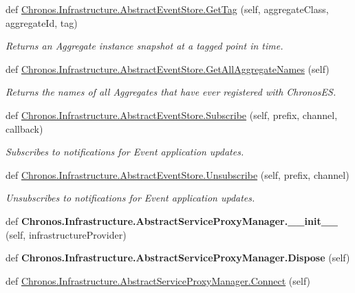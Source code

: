 \begin{DoxyCompactItemize}
\item 
def \hyperlink{group__Chronos_ga6e7bef46c596b6148c2afd64032c9cc7}{Chronos.\+Infrastructure.\+Abstract\+Event\+Store.\+Get\+Tag} (self, aggregate\+Class, aggregate\+Id, tag)
\begin{DoxyCompactList}\small\item\em Returns an Aggregate instance snapshot at a tagged point in time. \end{DoxyCompactList}\item 
def \hyperlink{group__Chronos_ga8c99114f487e0549eefe4b754d06ffa0}{Chronos.\+Infrastructure.\+Abstract\+Event\+Store.\+Get\+All\+Aggregate\+Names} (self)
\begin{DoxyCompactList}\small\item\em Returns the names of all Aggregates that have ever registered with Chronos\+ES. \end{DoxyCompactList}\item 
def \hyperlink{group__Chronos_gab7cf7e29ee38e091d177b793abdc8b0c}{Chronos.\+Infrastructure.\+Abstract\+Event\+Store.\+Subscribe} (self, prefix, channel, callback)
\begin{DoxyCompactList}\small\item\em Subscribes to notifications for Event application updates. \end{DoxyCompactList}\item 
def \hyperlink{group__Chronos_ga5d1257300d4e388a5061d8ffec6f1ff2}{Chronos.\+Infrastructure.\+Abstract\+Event\+Store.\+Unsubscribe} (self, prefix, channel)
\begin{DoxyCompactList}\small\item\em Unsubscribes to notifications for Event application updates. \end{DoxyCompactList}\item 
def {\bfseries Chronos.\+Infrastructure.\+Abstract\+Service\+Proxy\+Manager.\+\_\+\+\_\+init\+\_\+\+\_\+} (self, infrastructure\+Provider)\hypertarget{group__Chronos_gabe7b1bbccec08b8be6a5441869574d29}{}\label{group__Chronos_gabe7b1bbccec08b8be6a5441869574d29}

\item 
def {\bfseries Chronos.\+Infrastructure.\+Abstract\+Service\+Proxy\+Manager.\+Dispose} (self)\hypertarget{group__Chronos_ga74d297960d208c66e2ed2feea4e9f943}{}\label{group__Chronos_ga74d297960d208c66e2ed2feea4e9f943}

\item 
def \hyperlink{group__Chronos_ga7156c455573fce038d857e4b950a25b3}{Chronos.\+Infrastructure.\+Abstract\+Service\+Proxy\+Manager.\+Connect} (self)\hypertarget{group__Chronos_ga7156c455573fce038d857e4b950a25b3}{}\label{group__Chronos_ga7156c455573fce038d857e4b950a25b3}


\end{DoxyCompactItemize}
